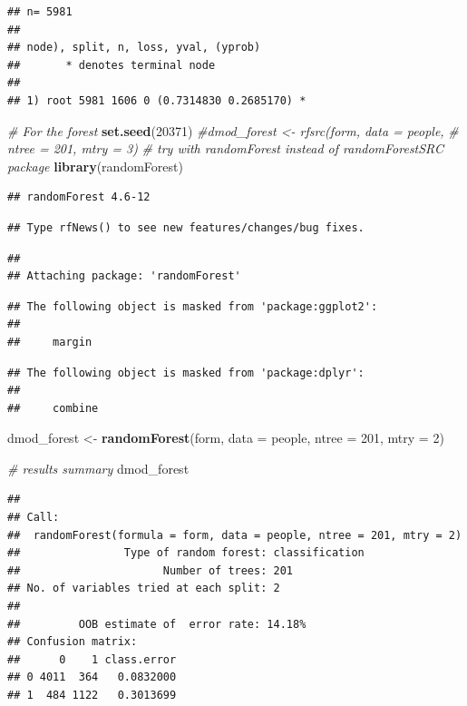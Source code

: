 \documentclass[]{article}
\newenvironment{Shaded}{\begin{snugshade}}{\end{snugshade}}
\newcommand{\KeywordTok}[1]{\textcolor[rgb]{0.13,0.29,0.53}{\textbf{{#1}}}}
\newcommand{\DataTypeTok}[1]{\textcolor[rgb]{0.13,0.29,0.53}{{#1}}}
\newcommand{\DecValTok}[1]{\textcolor[rgb]{0.00,0.00,0.81}{{#1}}}
\newcommand{\StringTok}[1]{\textcolor[rgb]{0.31,0.60,0.02}{{#1}}}
\newcommand{\CommentTok}[1]{\textcolor[rgb]{0.56,0.35,0.01}{\textit{{#1}}}}
\newcommand{\NormalTok}[1]{{#1}}
\begin{document}
\begin{verbatim}
## n= 5981 
## 
## node), split, n, loss, yval, (yprob)
##       * denotes terminal node
## 
## 1) root 5981 1606 0 (0.7314830 0.2685170) *
\end{verbatim}

\begin{Shaded}
\begin{Highlighting}[]
\CommentTok{# For the forest}
\KeywordTok{set.seed}\NormalTok{(}\DecValTok{20371}\NormalTok{)}
\CommentTok{#dmod_forest <- rfsrc(form, data = people, }
\CommentTok{#                     ntree = 201, mtry = 3)}
\CommentTok{# try with randomForest instead of randomForestSRC package}
\KeywordTok{library}\NormalTok{(randomForest)}
\end{Highlighting}
\end{Shaded}

\begin{verbatim}
## randomForest 4.6-12
\end{verbatim}

\begin{verbatim}
## Type rfNews() to see new features/changes/bug fixes.
\end{verbatim}

\begin{verbatim}
## 
## Attaching package: 'randomForest'
\end{verbatim}

\begin{verbatim}
## The following object is masked from 'package:ggplot2':
## 
##     margin
\end{verbatim}

\begin{verbatim}
## The following object is masked from 'package:dplyr':
## 
##     combine
\end{verbatim}

\begin{Shaded}
\begin{Highlighting}[]
\NormalTok{dmod_forest <-}\StringTok{ }\KeywordTok{randomForest}\NormalTok{(form, }\DataTypeTok{data =} \NormalTok{people, }
                     \DataTypeTok{ntree =} \DecValTok{201}\NormalTok{, }\DataTypeTok{mtry =} \DecValTok{2}\NormalTok{)}

\CommentTok{# results summary}
\NormalTok{dmod_forest}
\end{Highlighting}
\end{Shaded}

\begin{verbatim}
## 
## Call:
##  randomForest(formula = form, data = people, ntree = 201, mtry = 2) 
##                Type of random forest: classification
##                      Number of trees: 201
## No. of variables tried at each split: 2
## 
##         OOB estimate of  error rate: 14.18%
## Confusion matrix:
##      0    1 class.error
## 0 4011  364   0.0832000
## 1  484 1122   0.3013699
\end{verbatim}
\end{document}

